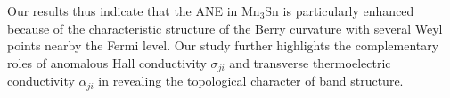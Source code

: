 \documentclass[amsmath,amssymb]{nature}
\newcommand{\new}[1]{\textcolor{red}{#1}}
\begin{document}
 Our results thus indicate that the ANE in Mn$_3$Sn is particularly enhanced because of the characteristic structure of the Berry curvature with several Weyl points nearby the Fermi level\cite{Yang2016,Pallab2015}.  Our study further highlights the complementary roles of anomalous Hall conductivity $\sigma_{ji}$ and transverse thermoelectric conductivity $\alpha_{ji}$ in revealing the topological character of band structure. 

\end{document}

